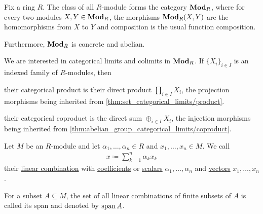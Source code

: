 \begin{definition}\label{def:category_of_modules}
  Fix a ring $R$. The class of all $R$-module forms the category $\operatorname{\mathbf{Mod}}_R$, where for every two modules $X, Y \in \operatorname{\mathbf{Mod}}_R$, the morphisms $\operatorname{\mathbf{Mod}}_R(X, Y)$ are the homomorphisms from $X$ to $Y$ and composition is the usual function composition.

  Furthermore, $\operatorname{\mathbf{Mod}}_R$ is concrete and abelian.
\end{definition}

\begin{proposition}\label{thm:module_categorical_limits}
  We are interested in categorical limits and colimits in $\operatorname{\mathbf{Mod}}_R$. If $\{ X_i \}_{i \in I}$ is an indexed family of $R$-modules, then
  \begin{defenum}
    \item\label{thm:module_categorical_limits/product} their categorical product is their direct product $\prod_{i \in I} X_i$, the projection morphisms being inherited from \cref{thm:set_categorical_limits/product}.

    \item\label{thm:module_categorical_limits/coproduct} their categorical coproduct is the direct sum $\oplus_{i \in I} X_i$, the injection morphisms being inherited from \cref{thm:abelian_group_categorical_limits/coproduct}.
  \end{defenum}
\end{proposition}

\begin{definition}\label{def:linear_combination}
  Let $M$ be an $R$-module and let $\alpha_1, \ldots, \alpha_n \in R$ and $x_1, \ldots, x_n \in M$. We call
  \begin{align*}
    x \coloneqq \sum_{k=1}^n \alpha_k x_k
  \end{align*}
  their \uline{linear combination} with \uline{coefficients} or \uline{scalars} $\alpha_1, \ldots, \alpha_n$ and \uline{vectors} $x_1, \ldots, x_n$.

  For a subset $A \subseteq M$, the set of all linear combinations of finite subsets of $A$ is called its span and denoted by $\operatorname{span}{A}$.
\end{definition}

